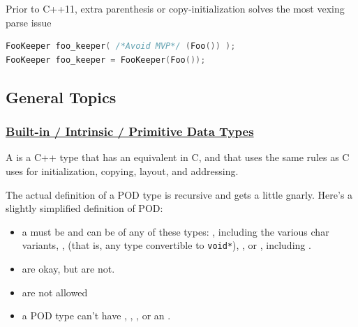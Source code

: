 Prior to C++11, extra parenthesis or copy-initialization solves the 
most vexing parse issue
\begin{lstlisting}[language=C++]
FooKeeper foo_keeper( /*Avoid MVP*/ (Foo()) );
FooKeeper foo_keeper = FooKeeper(Foo());
\end{lstlisting}

\subsection{General Topics}
\subsubsection{\href{https://isocpp.org/wiki/faq/intrinsic-types}{Built-in / Intrinsic / Primitive Data Types}}
A  is a C++ type that has an equivalent in C, and 
that uses the same rules as C uses for initialization, copying, layout, 
and addressing.

The actual definition of a POD type is recursive and gets a little gnarly. 
\newline
Here’s a slightly simplified definition of POD: 
\begin{itemize}
    \item a  must be 
           and can be of any of these types: 
          ,  including the 
          various char variants, 
          \newline
          ,  
          (that is, any type convertible to \texttt{void*}), 
          , or 
          , including . 
    \item {} are okay, 
          but  are not. 
    \item {} are not allowed
    \item a POD type can’t have , , 
          , or an 
          \newline
          .
\end{itemize}

